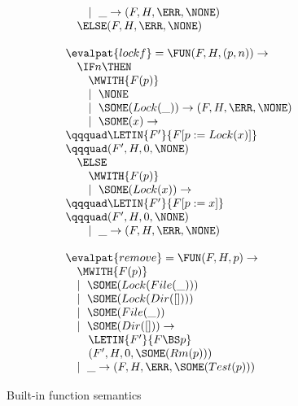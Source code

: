 \begin{figure*}
\begin{minipage}[t]{0.5\linewidth}
\begin{displaymath}
\begin{array}{l}
\qquad \mid~\_  \rightarrow (F,H,\ERR,\NONE) \\
\quad \ELSE (F,H,\ERR,\NONE) \\
\\
\evalpat{lockf} = \FUN (F,H,(p,n)) \rightarrow \\
\quad \IF n \THEN \\
\qquad \MWITH{F(p)} \\
\qquad \mid~\NONE \\
\qquad \mid~\SOME(Lock(\_)) \rightarrow (F,H,\ERR,\NONE) \\
\qquad \mid~\SOME(x) \rightarrow \\
\qqquad \LETIN{F'}{F[p := Lock(x)]} \\
\qqquad (F',H,0,\NONE) \\
\quad \ELSE \\
\qquad \MWITH{F(p)} \\
\qquad \mid~\SOME(Lock(x)) \rightarrow \\
\qqquad \LETIN{F'}{F[p := x]} \\
\qqquad (F',H,0,\NONE) \\
\qquad \mid~\_ \rightarrow (F,H,\ERR,\NONE) \\
\\
\evalpat{remove} = \FUN (F,H,p) \rightarrow \\
\quad \MWITH{F(p)} \\
\quad \mid~\SOME(Lock(File(\_))) \\
\quad \mid~\SOME(Lock(Dir([]))) \\
\quad \mid~\SOME(File(\_)) \\
\quad \mid~\SOME(Dir([])) \rightarrow \\
\qquad \LETIN{F'}{F \BS p} \\
\qquad (F',H,0,\SOME(Rm(p))) \\
\quad \mid~\_  \rightarrow (F,H,\ERR,\SOME(Test(p)))
\end{array}
\end{displaymath}
\end{minipage}
\caption{Built-in function semantics}
\end{figure*}
